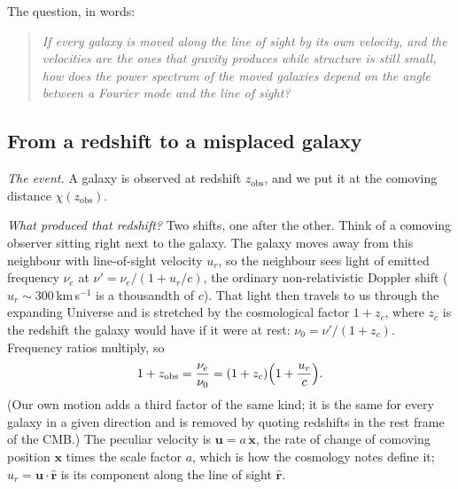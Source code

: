 The question, in words:
\begin{quote}
\emph{If every galaxy is moved along the line of sight by its own velocity, and
the velocities are the ones that gravity produces while structure is still
small, how does the power spectrum of the moved galaxies depend on the angle
between a Fourier mode and the line of sight?}
\end{quote}

\subsection{From a redshift to a misplaced galaxy}
\label{11a:sec:rsd-map}

\emph{The event.} A galaxy is observed at redshift $z_{\mathrm{obs}}$, and we put it
at the comoving distance $\chi(z_{\mathrm{obs}})$.

\emph{What produced that redshift?} Two shifts, one after the other. Think of a
comoving observer  sitting
right next to the galaxy. The galaxy moves away from this neighbour with
line-of-sight velocity $u_r$, so the neighbour sees light of emitted frequency
$\nu_e$ at $\nu'=\nu_e/(1+u_r/c)$, the ordinary non-relativistic Doppler shift
($u_r\sim300$\,km\,s$^{-1}$ is a thousandth of $c$). That light then travels to
us through the expanding Universe and is stretched by the cosmological factor
$1+z_c$, where $z_c$ is the redshift the galaxy would have if it were at rest:
$\nu_0=\nu'/(1+z_c)$. Frequency ratios multiply, so
\begin{equation}
  1+z_{\mathrm{obs}}=\frac{\nu_e}{\nu_0}=(1+z_c)\Bigl(1+\frac{u_r}{c}\Bigr).
  \label{11a:eq:z-compose}
\end{equation}
(Our own motion adds a third factor of the same kind; it is the same for every
galaxy in a given direction and is removed by quoting redshifts in the rest frame
of the CMB.) The peculiar velocity is $\bm u=a\,\dot{\bm x}$, the rate of change
of comoving position $\bm x$ times the scale factor $a$, which is how the
cosmology notes define it; $u_r=\bm u\cdot\hat{\bm r}$ is its component along the
line of sight $\hat{\bm r}$.


